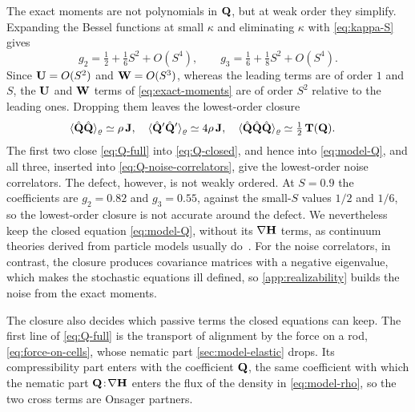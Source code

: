 \documentclass[aps,pre,reprint,superscriptaddress,longbibliography,nofootinbib
]{revtex4-2}
\begin{document}
The exact moments are not polynomials in $\mathbf{Q}$, but at weak
order they simplify. Expanding the Bessel functions at
small $\kappa$ and eliminating $\kappa$ with
\cref{eq:kappa-S} gives
\begin{equation}
  \label{eq:g-small-S}
  g_2=\tfrac12+\tfrac16S^2+O(S^4),
  \qquad
  g_3=\tfrac16+\tfrac18S^2+O(S^4).
\end{equation}
Since $\mathbf{U}=O(S^2)$ and $\mathbf{W}=O(S^3)$, whereas the leading
terms are of order $1$ and $S$, the $\mathbf{U}$ and $\mathbf{W}$ terms of
\cref{eq:exact-moments} are of order $S^2$ relative to the
leading ones. Dropping them leaves the lowest-order closure
\begin{align}
  \label{eq:leading-closure}
  &\langle\hat{\mathbf{Q}}\hat{\mathbf{Q}}\rangle_\varrho\simeq\rho\,\mathbf{J},
  \quad
  \langle\hat{\mathbf{Q}}'\hat{\mathbf{Q}}'\rangle_\varrho\simeq4\rho\,\mathbf{J},
  \quad \langle\hat{\mathbf{Q}}\hat{\mathbf{Q}}\hat{\mathbf{Q}}\rangle_\varrho\simeq\tfrac12\,\mathbf{T}(\mathbf{Q}).
\end{align}
The first two close \cref{eq:Q-full} into
\cref{eq:Q-closed}, and hence into \cref{eq:model-Q}, and
all three, inserted into \cref{eq:Q-noise-correlators},
give the lowest-order noise correlators. The defect,
however, is not weakly ordered. At $S=0.9$ the coefficients
are $g_2=0.82$ and $g_3=0.55$, against the small-$S$ values
$1/2$ and $1/6$, so the lowest-order closure is not
accurate around the defect. We nevertheless keep the closed
equation \cref{eq:model-Q}, without its $\nabla\mathbf{H}$ terms,
as continuum theories derived from particle models usually
do~\cite{baskaran2008hydrodynamics,bertin2013,
grossmann2016mesoscale,peshkov2012nonlinear}. For the noise
correlators, in contrast, the closure produces covariance
matrices with a negative eigenvalue, which makes the
stochastic equations ill defined, so
\cref{app:realizability} builds the noise from the exact
moments.

The closure also decides which passive terms the closed
equations can keep. The first line of \cref{eq:Q-full} is
the transport of alignment by the force on a rod,
\cref{eq:force-on-cells}, whose nematic part
\cref{sec:model-elastic} drops. Its compressibility part
enters with the coefficient $\mathbf{Q}$, the same coefficient with
which the nematic part $\mathbf{Q}\!:\!\nabla\mathbf{H}$ enters the flux of
the density in \cref{eq:model-rho}, so the two cross terms
are Onsager partners.
\end{document}
